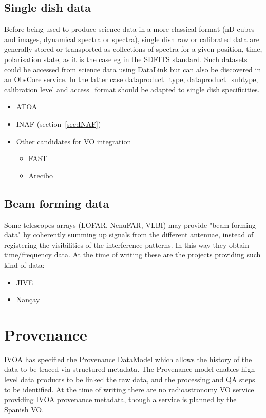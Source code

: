 \documentclass[11pt,a4paper]{ivoa}
\begin{document}
\subsection{Single dish data}
Before being used to produce science data in a more classical format (nD cubes and images, dynamical 
spectra or spectra),  single dish  raw or calibrated data are generally stored or transported as 
collections of spectra for a given position, time, polarisation state, as it is the case eg in the 
SDFITS standard. Such datasets could be accessed from science data using DataLink but can also be 
discovered in an ObsCore service. In the latter case dataproduct\_type, dataproduct\_subtype, 
calibration level and access\_format should be adapted to single dish specificities.
\begin{itemize}
\item ATOA 
\item INAF (section~\ref{sec:INAF})
\item Other candidates for VO integration
\begin{itemize}
\item  FAST
\item Arecibo
\end{itemize}
\end{itemize}
\subsection{Beam forming data}
Some telescopes arrays (LOFAR, NenuFAR, VLBI) may provide "beam-forming data" by coherently summing up 
signals from the different antennae, instead of registering the visibilities of the interference 
patterns. In this way they obtain time/frequency data. At the time of writing these are the projects 
providing such kind of data:
\begin{itemize}
\item JIVE
\item Nan\c cay
\end{itemize}
\section{Provenance}

IVOA has specified the Provenance DataModel \citep{2020ivoa.spec.0411S} which allows the history of the 
data to be traced via structured metadata. The Provenance model enables high-level data products to be 
linked the raw data, and the processing and QA steps to be identified. At the time of writing there are 
no radioastronomy VO service providing IVOA provenance metadata, though a service is planned by the 
Spanish VO.   
\end{document}
